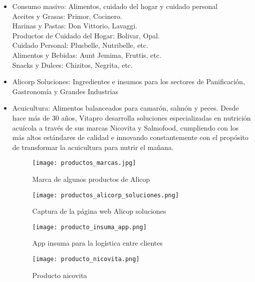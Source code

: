 \begin{itemize}
\item Consumo masivo: Alimentos, cuidado del hogar y cuidado personal
\\Aceites y Grasas: Primor, Cocinero. 
\\Harinas y Pastas: Don Vittorio, Lavaggi. 
\\Productos de Cuidado del Hogar: Bolivar, Opal. 
\\Cuidado Personal: Plusbelle, Nutribelle, etc. 
\\Alimentos y Bebidas: Aunt Jemima, Fruttis, etc. 
\\Snacks y Dulces: Chizitos, Negrita, etc. 


\item Alicorp Soluciones: Ingredientes e insumos para los sectores de Panificación, Gastronomía y Grandes Industrias\\


\item Acuicultura: Alimentos balanceados para camarón, salmón y peces.
Desde hace más de 30 años, Vitapro desarrolla soluciones especializadas en nutrición acuícola a través de sus marcas Nicovita y Salmofood, cumpliendo con los más altos estándares de calidad e innovando constantemente con el propósito de transformar la acuicultura para nutrir el mañana.

\begin{figure}[!ht]
    \centering
    \texttt{[image: productos\_marcas.jpg]}
    \caption{Marca de algunos productos de Alicop}
\end{figure}

\begin{figure}[!ht]
    \centering
    \texttt{[image: productos\_alicorp\_soluciones.png]}
    \caption{Captura de la página web Alicop soluciones}
\end{figure}

\begin{figure}[!ht]
    \centering
    \texttt{[image: producto\_insuma\_app.png]}
    \caption{App insuma para la logística entre clientes}
\end{figure}

\begin{figure}[!ht]
    \centering
    \texttt{[image: producto\_nicovita.png]}
    \caption{Producto nicovita}
\end{figure}

\end{itemize}
